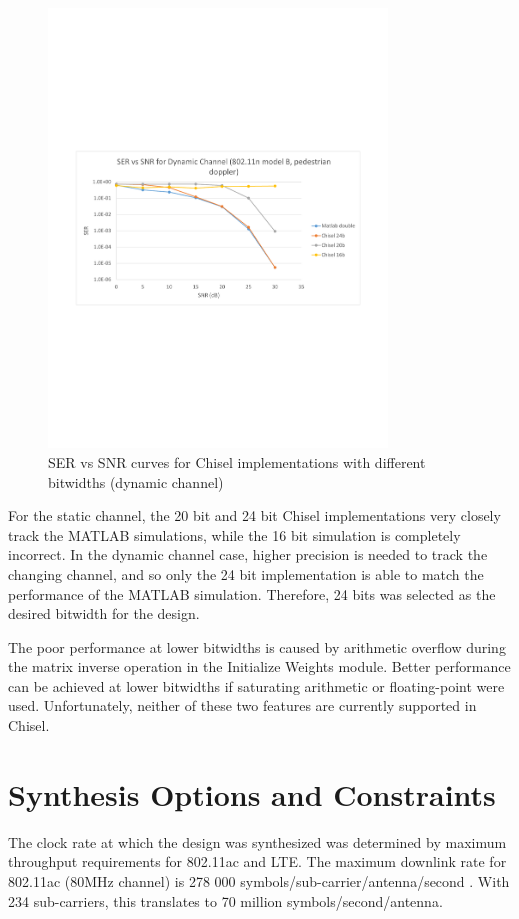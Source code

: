 \documentclass[journal]{IEEEtran}
\begin{document}
\begin{figure}[!h]
\centering
\includegraphics*[width=9cm, viewport = 80 270 560 530]{images/snr_ber_curves_chisel_doppler.pdf}
\caption{SER vs SNR curves for Chisel implementations with different bitwidths (dynamic channel)}
\label{ser_ber_chisel_dynamic}
\end{figure}

For the static channel, the 20 bit and 24 bit Chisel implementations very closely track the MATLAB simulations, while the 16 bit simulation is completely incorrect. In the dynamic channel case, higher precision is needed to track the changing channel, and so only the 24 bit implementation is able to match the performance of the MATLAB simulation. Therefore, 24 bits was selected as the desired bitwidth for the design.

The poor performance at lower bitwidths is caused by arithmetic overflow during the matrix inverse operation in the Initialize Weights module. Better performance can be achieved at lower bitwidths if saturating arithmetic or floating-point were used. Unfortunately, neither of these two features are currently supported in Chisel.


\section{Synthesis Options and Constraints}

The clock rate at which the design was synthesized was determined by maximum throughput requirements for 802.11ac and LTE. The maximum downlink rate for 802.11ac (80MHz channel) is 278 000 symbols/sub-carrier/antenna/second \cite{802_11_ac_handbook}. With 234 sub-carriers, this translates to 70 million symbols/second/antenna.
\end{document}
